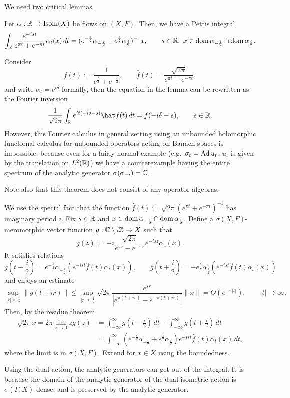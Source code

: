 \documentclass{../../../small}
\begin{document}
We need two critical lemmas.

\begin{lem}
Let $\alpha:\mathbb{R}\to\operatorname{Isom}(X)$ be flows on $(X,F)$.
Then, we have a Pettis integral
\[\int_{\mathbb{R}}\frac{e^{-ist}}{e^{\pi t}+e^{-\pi t}}\alpha_t(x)\,dt
=(e^{-\frac s2}\alpha_{-\frac i2}+e^{\frac s2}\alpha_{\frac i2})^{-1}x,\qquad s\in\mathbb{R},\ x\in\operatorname{dom}\alpha_{-\frac i2}\cap\operatorname{dom}\alpha_{\frac i2}.\]
\end{lem}
\begin{rmk*}
Consider
\[f(t):=\frac1{e^{\frac t2}+e^{-\frac t2}},\qquad\hat f(t)=\frac{\sqrt{2\pi}}{e^{\pi t}+e^{-\pi t}},\] and write $\alpha_t=e^{t\delta}$ formally, then the equation in the lemma can be rewritten as the Fourier inversion
\[\frac1{\sqrt{2\pi}}\int_\R e^{it(-i\delta-s)}\hat f(t)\,dt=f(-i\delta-s),\qquad s\in\R.\]
However, this Fourier calculus in general setting using an unbounded holomorphic functional calculus for unbounded operators acting on Banach spaces is impossible, because even for a fairly normal example (e.g.~$\sigma_t=\operatorname{Ad} u_t$, $u_t$ is given by the translation on $L^2(\mathbb{R})$) we have a counterexample having the entire spectrum of the analytic generator $\sigma(\sigma_{-i})=\mathbb{C}$.

Note also that this theorem does not consist of any operator algebras.
\end{rmk*}
\begin{pf}
We use the special fact that the function $\hat f(t):=\sqrt{2\pi}(e^{\pi t}+e^{-\pi t})^{-1}$ has imaginary period $i$.
Fix $s\in\mathbb{R}$ and $x\in\operatorname{dom}\alpha_{-\frac i2}\cap\operatorname{dom}\alpha_{\frac i2}$.
Define a $\sigma(X,F)$-meromorphic vector function $g:\mathbb{C}\setminus i\mathbb{Z}\to X$ such that
\[g(z):=-i\frac{\sqrt{2\pi}}{e^{\pi z}-e^{-\pi z}}e^{-isz}\alpha_z(x).\]
It satisfies relations
\[g(t-\frac i2)=e^{-\frac s2}\alpha_{-\frac i2}(e^{-ist}\hat f(t)\alpha_t(x)),\qquad
g(t+\frac i2)=-e^{\frac s2}\alpha_{\frac i2}(e^{-ist}\hat f(t)\alpha_t(x))\]
and enjoys an estimate
\[\sup_{|r|\le\frac12}\|g(t+ir)\|\le\sup_{|r|\le\frac12}\sqrt{2\pi}\frac{e^{sr}}{|e^{\pi(t+ir)}-e^{-\pi(t+ir)}|}\|x\|=O(e^{-\pi|t|}),\qquad|t|\to\infty.\]
Then, by the residue theorem
\begin{align*}
\sqrt{2\pi}x=2\pi\lim_{z\to0}zg(z)
&=\int_{-\infty}^\infty g(t-\frac i2)\,dt-\int_{-\infty}^\infty g(t+\frac i2)\,dt\\
&=\int_{-\infty}^\infty(e^{-\frac s2}\alpha_{-\frac i2}+e^{\frac s2}\alpha_{\frac i2})e^{-ist}\hat f(t)\alpha_t(x)\,dt,
\end{align*}
where the limit is in $\sigma(X,F)$.
Extend for $x\in X$ using the boundedness.

Using the dual action, the analytic generators can get out of the integral.
It is because the domain of the analytic generator of the dual isometric action is $\sigma(F,X)$-dense, and is preserved by the analytic generator.

\end{pf}
\end{document}
